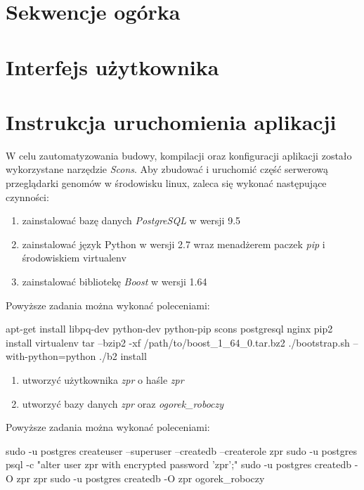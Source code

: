 \section{Sekwencje ogórka}

\section{Interfejs użytkownika}

\section{Instrukcja uruchomienia aplikacji}
W celu zautomatyzowania budowy, kompilacji oraz konfiguracji aplikacji zostało wykorzystane narzędzie \textit{Scons}.
Aby zbudować i uruchomić część serwerową przeglądarki genomów w środowisku linux, zaleca się wykonać następujące czynności:
\begin{enumerate}
	\item zainstalować bazę danych \textit{PostgreSQL} w wersji 9.5
	\item zainstalować język Python w wersji 2.7 wraz menadżerem paczek \textit{pip} i środowiskiem virtualenv
	\item zainstalować bibliotekę \textit{Boost} w wersji 1.64
\end{enumerate}
Powyższe zadania można wykonać poleceniami:

\begin{spverbatim}
	apt-get install libpq-dev python-dev python-pip scons postgresql nginx
	pip2 install virtualenv
	tar --bzip2 -xf /path/to/boost_1_64_0.tar.bz2 ./bootstrap.sh --with-python=python ./b2 install
\end{spverbatim}

\begin{enumerate}[resume]
	\item utworzyć użytkownika \textit{zpr} o haśle \textit{zpr}
	\item utworzyć bazy danych \textit{zpr} oraz \textit{ogorek\_roboczy}
\end{enumerate}
Powyższe zadania można wykonać poleceniami:

\begin{spverbatim}
	sudo -u postgres createuser --superuser --createdb --createrole zpr 
	sudo -u postgres psql -c "alter user zpr with encrypted password 'zpr';"
	sudo -u postgres createdb -O zpr zpr 
	sudo -u postgres createdb -O zpr ogorek_roboczy
\end{spverbatim}





